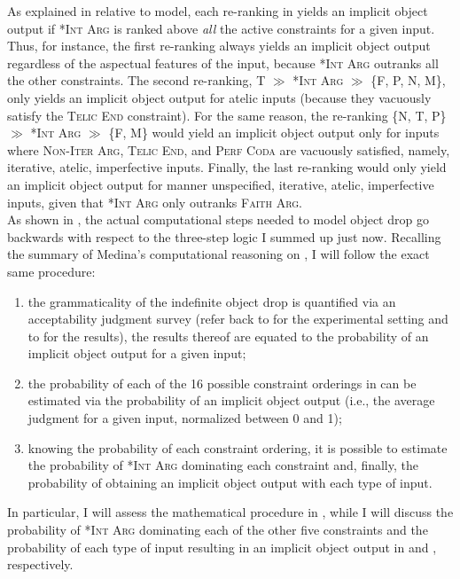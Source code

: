 As explained in  relative to  model, each re-ranking in  yields an implicit object output if \textsc{*Int Arg} is ranked above \textit{all} the active constraints for a given input. Thus, for instance, the first re-ranking always yields an implicit object output regardless of the aspectual features of the input, because \textsc{*Int Arg} outranks all the other constraints. The second re-ranking, T $\gg$ \textsc{*Int Arg} $\gg$ \{F, P, N, M\}, only yields an implicit object output for atelic inputs (because they vacuously satisfy the \textsc{Telic End} constraint). For the same reason, the re-ranking \{N, T, P\} $\gg$ \textsc{*Int Arg} $\gg$ \{F, M\} would yield an implicit object output only for inputs where \textsc{Non-Iter Arg}, \textsc{Telic End}, and \textsc{Perf Coda} are vacuously satisfied, namely, iterative, atelic, imperfective inputs. Finally, the last re-ranking would only yield an implicit object output for manner unspecified, iterative, atelic, imperfective inputs, given that \textsc{*Int Arg} only outranks \textsc{Faith Arg}.\\
As shown in , the actual computational steps needed to model object drop go backwards with respect to the three-step logic I summed up just now. Recalling the summary of Medina's computational reasoning on , I will follow the exact same procedure:
\begin{enumerate}
    \item the grammaticality of the indefinite object drop is quantified via an acceptability judgment survey (refer back to  for the experimental setting and to  for the results), the results thereof are equated to the probability of an implicit object output for a given input;
    \item the probability of each of the 16 possible constraint orderings in  can be estimated via the probability of an implicit object output (i.e., the average judgment for a given input, normalized between 0 and 1);
    \item knowing the probability of each constraint ordering, it is possible to estimate the probability of \textsc{*Int Arg} dominating each constraint and, finally, the probability of obtaining an implicit object output with each type of input.
\end{enumerate}

In particular, I will assess the mathematical procedure in , while I will discuss the probability of \textsc{*Int Arg} dominating each of the other five constraints and the probability of each type of input resulting in an implicit object output in  and , respectively.


